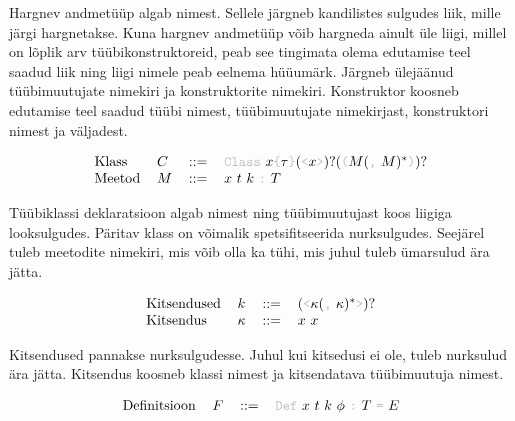 \documentclass[12pt]{article}
\begin{document}
      Hargnev andmetüüp algab nimest. Sellele järgneb kandilistes sulgudes liik, mille järgi hargnetakse. Kuna hargnev andmetüüp võib hargneda ainult üle liigi, millel on lõplik arv tüübikonstruktoreid, peab see tingimata olema edutamise teel saadud liik ning liigi nimele peab eelnema hüüumärk. Järgneb ülejäänud tüübimuutujate nimekiri ja konstruktorite nimekiri. Konstruktor koosneb edutamise teel saadud tüübi nimest, tüübimuutujate nimekirjast, konstruktori nimest ja väljadest.

      \begin{equation*}
        \begin{tabular}{llll}
          Klass  & $C$ & $::=$ & {\color{helehall}\verb!Class!} $x${\color{helehall}\verb!{!}$\tau${\color{helehall}\verb!}!}$(${\color{helehall}\verb!<!}$x${\color{helehall}\verb!>!}$)?(${\color{helehall}\verb!(!}$M(${\color{helehall}\verb!,!} $M)^*${\color{helehall}\verb!)!}$)?$ \\
          Meetod & $M$ & $::=$ & $x$ $t$ $k$ {\color{helehall}\verb!:!} $T$
        \end{tabular}
      \end{equation*}

      Tüübiklassi deklaratsioon algab nimest ning tüübimuutujast koos liigiga looksulgudes. Päritav klass on võimalik spetsifitseerida nurksulgudes. Seejärel tuleb meetodite nimekiri, mis võib olla ka tühi, mis juhul tuleb ümarsulud ära jätta.

      \begin{equation*}
        \begin{tabular}{llll}
          Kitsendused & $k$      & $::=$ & $(${\color{helehall}\verb!<!}$\kappa(${\color{helehall}\verb!,!} $\kappa)^*${\color{helehall}\verb!>!}$)?$ \\
          Kitsendus   & $\kappa$ & $::=$ & $x$ $x$
        \end{tabular}
      \end{equation*}

      Kitsendused pannakse nurksulgudesse. Juhul kui kitsedusi ei ole, tuleb nurksulud ära jätta. Kitsendus koosneb klassi nimest ja kitsendatava tüübimuutuja nimest.

      \begin{equation*}
        \begin{tabular}{llll}
          Definitsioon & $F$ & $::=$ & {\color{helehall}\verb!Def!} $x$ $t$ $k$ $\phi$ {\color{helehall}\verb!:!} $T$ {\color{helehall}\verb!=!} $E$
        \end{tabular}
      \end{equation*}
\end{document}
